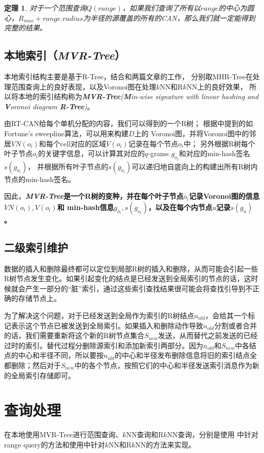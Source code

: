 \documentclass{ML}
\newtheorem{theorem}{\hspace{2em}定理}
\begin{document}
\begin{theorem}\label{theorem:RT-CAN-2}
  对于一个范围查询$Q(range)$，如果我们查询了所有以$range$的中心为圆心，$R_{max}+range.radius$为半径的源覆盖的所有的CAN，那么我们就一定能得到完整的结果。
\end{theorem}

\subsection{本地索引（\textit{MVR-Tree}）}
本地索引结构主要是基于R-Tree\cite{R-Tree}，结合\cite{MHR-Tree}和\cite{VoR-Tree}两篇文章的工作，
分别取MHR-Tree在处理范围查询上的良好表现，以及Voronoi图在处理$k$NN和R$k$NN上的良好效果，
所以将本地的索引结构称为\textit{\textbf{MVR-Tree}(\textbf{M}in-wise signature with linear hashing and \textbf{V}oronoi diagram \textbf{R-Tree})}。

由RT-CAN给每个单机分配的内容，我们可以得到的一个R树；%
根据\cite{VD-Property}中提到的如Fortune's sweepline算法，可以用来构建$D$上的
Voronoi图，并将Voronoi图中的邻居$VN(o_i)$和每个cell对应的区域$V(o_i)$记录在每个节点$o_i$中；
另外根据R树每个叶子节点$o_i$的关键字信息，可以计算其对应的$q$-grams $g_{o_i}$和对应的min-hash签名$s(g_{o_i})$，
并根据所有叶子节点的$s(g_{o_i})$可以递归地自底向上的构建出所有R树内节点的min-hash签名\cite{MHR-Tree}。

因此，\textbf{\textit{MVR-Tree}是一个R树的变种，并在每个叶子节点$o_i$记录Voronoi图的信息$VN(o_i), V(o_i)$和
min-hash信息$g_{o_i}, s(g_{o_i})$，以及在每个内节点$u$记录$s(g_u)$。}

\subsection{二级索引维护}\label{sec:maintain-index}
数据的插入和删除最终都可以定位到局部R树的插入和删除，从而可能会引起一些R树节点发生变化。如果引起变化的结点是已经发送到全局索引的节点的话，这时候就会产生一部分的“脏”索引，通过这些索引查找结果很可能会将查找引导到不正确的存储节点上。

为了解决这个问题，对于已经发送到全局作为索引的R树结点$n_{old}$，会给其一个标记表示这个节点已被发送到全局索引。如果插入和删除动作导致$n_{old}$分割或者合并的话，我们需要重新将这个新的R树节点集合$S_{new}$发送，从而替代之前发送的已经
过时的索引。替代过程分删除源索引和添加新索引两部分。因为$n_{old}$和$S_{new}$中各结点的中心和半径不同，所以要按$n_{old}$的中心和半径发布删除信息将旧的索引结点全都删除；然后对于$S_{new}$中的各个节点，按照它们的中心和半径发送索引消息作为新的全局索引存储即可。
\section{查询处理}
在本地使用MVR-Tree进行范围查询、$k$NN查询和R$k$NN查询，分别是使用\cite{MHR-Tree}
中针对range query的方法和使用\cite{VoR-Tree}中针对$k$NN和R$k$NN的方法来实现。
\end{document}
